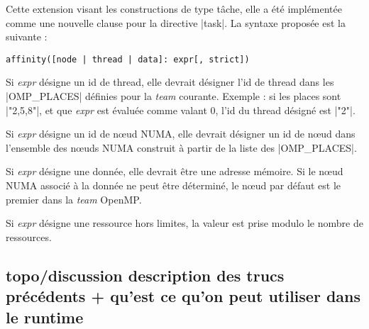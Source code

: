 Cette extension visant les constructions de type tâche, elle a été implémentée
comme une nouvelle clause pour la directive |task|. La syntaxe proposée est la
suivante :

\begin{lstlisting}
affinity([node | thread | data]: expr[, strict])
\end{lstlisting}

Si \emph{expr} désigne un id de thread, elle devrait désigner l'id de thread dans
les |OMP_PLACES| définies pour la \textit{team} courante. Exemple : si les places
sont |"{2},{5},{8}"|, et que \emph{expr} est évaluée comme valant 0, l'id du thread désigné est |"{2}"|.

Si \emph{expr} désigne un id de nœud NUMA, elle devrait désigner un id de nœud
dans l'ensemble des nœuds NUMA construit à partir de la liste des |OMP_PLACES|.

Si \emph{expr} désigne une donnée, elle devrait être une adresse mémoire.
Si le nœud NUMA associé à la donnée ne peut être déterminé, le nœud par défaut
est le premier dans la \textit{team} OpenMP.

Si \emph{expr} désigne une ressource hors limites, la valeur est prise modulo le
nombre de ressources.

\subsection{topo/discussion description des trucs précédents + qu'est ce qu'on peut utiliser dans le runtime}

